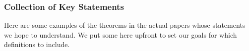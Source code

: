 \documentclass{article}
\theoremstyle{definition}
\theoremstyle{definition}
\theoremstyle{definition}
\begin{document}








\subsubsection{Collection of Key Statements}

Here are some examples of the theorems in the actual papers whose statements we hope to understand. We put some here upfront to set our goals for which definitions to include.
\end{document}
